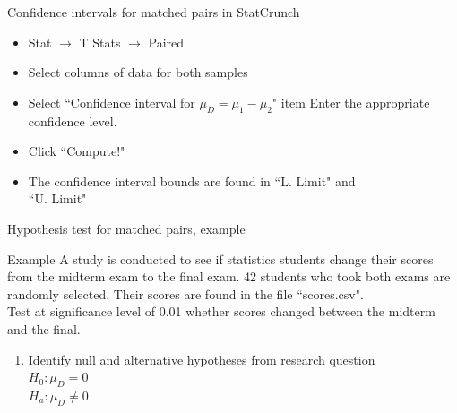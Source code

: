 \documentclass[xcolor=table]{beamer}
\begin{document}
\begin{frame}{Confidence intervals for matched pairs in StatCrunch}

\begin{block}{}
\begin{itemize}
\large
\item Stat $\to$ T Stats $\to$ Paired
\item Select columns of data for both samples
\item Select ``Confidence interval for $\mu_D = \mu_1 - \mu_2$"
item Enter the appropriate confidence level.
\item Click ``Compute!"
\item The confidence interval bounds are found in ``L. Limit" and\\ ``U. Limit"
\end{itemize}
\end{block}

\end{frame}

\begin{frame}{Hypothesis test for matched pairs, example}
\large
\begin{exampleblock}{Example}
A study is conducted to see if statistics students change their scores from the midterm exam to the final exam. 42 students who took both exams are randomly selected. Their scores are found in the file ``scores.csv".\\
\medskip
Test at significance level of 0.01 whether scores changed between the midterm and the final.
\begin{enumerate}
\pause\item Identify null and alternative hypotheses from research question\\
\pause$H_0: \mu_D = 0$\\
$H_a: \mu_D \ne 0$\\
\end{enumerate}
\end{exampleblock}
\end{frame}
\end{document}
